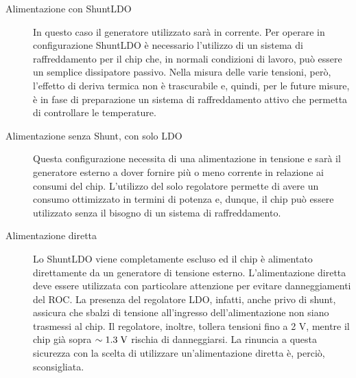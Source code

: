 \begin{description}
\item[Alimentazione con ShuntLDO] In questo caso il generatore utilizzato sarà in corrente. Per operare in configurazione ShuntLDO è necessario l'utilizzo di un sistema di raffreddamento per il chip che, in normali condizioni di lavoro, può essere un semplice dissipatore passivo. Nella misura delle varie tensioni, però, l'effetto di deriva termica non è trascurabile e, quindi, per le future misure, \`e in fase di preparazione un sistema di raffreddamento attivo che permetta di controllare le temperature.

\item[Alimentazione senza Shunt, con solo LDO] Questa configurazione necessita di una alimentazione in tensione e sarà il generatore esterno a dover fornire più o meno corrente in relazione ai consumi del chip. L'utilizzo del solo regolatore permette di avere un consumo ottimizzato in termini di potenza e, dunque, il chip pu\`o essere utilizzato senza il bisogno di un sistema di raffreddamento.

\item[Alimentazione diretta] Lo ShuntLDO viene completamente escluso ed il chip è alimentato direttamente da un generatore di tensione esterno. L'alimentazione diretta deve essere utilizzata con particolare attenzione per evitare danneggiamenti del ROC. La presenza del regolatore LDO, infatti, anche privo di shunt, assicura che sbalzi di tensione all'ingresso dell'alimentazione non siano trasmessi al chip. Il regolatore, inoltre, tollera tensioni fino a 2 V, mentre il chip già sopra $\sim 1.3\rm \; V$ rischia di danneggiarsi. La rinuncia a questa sicurezza con la scelta di utilizzare un'alimentazione diretta è, perciò, sconsigliata. 
\end{description}

